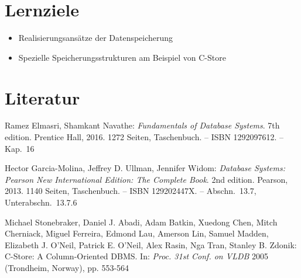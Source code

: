 \section*{Lernziele}
\begin{itemize}
\item Realisierungsansätze der Datenspeicherung
\item Spezielle Speicherungsstrukturen am Beispiel von C-Store
\end{itemize}


\section*{Literatur}



Ramez Elmasri, Shamkant Navathe:
\emph{Fundamentals of Database Systems}.
7th edition. Prentice Hall, 2016. 1272 Seiten, Taschenbuch.
-- ISBN 1292097612.
-- Kap.~16

Hector Garcia-Molina, Jeffrey D. Ullman, Jennifer Widom:
\emph{Database Systems: Pearson New International Edition: The Complete Book}.
2nd edition. Pearson, 2013. 1140 Seiten, Taschenbuch.
-- ISBN 129202447X.
-- Abschn.~13.7, Unterabschn.~13.7.6

Michael Stonebraker, Daniel J. Abadi, Adam Batkin, Xuedong Chen, Mitch Cherniack, Miguel Ferreira, Edmond Lau, Amerson Lin, Samuel Madden, Elizabeth J. O'Neil, Patrick E. O'Neil, Alex Rasin, Nga Tran, Stanley B. Zdonik: C-Store: A Column-Oriented DBMS. In: \emph{Proc. 31st Conf. on VLDB} 2005 (Trondheim, Norway), pp. 553-564
